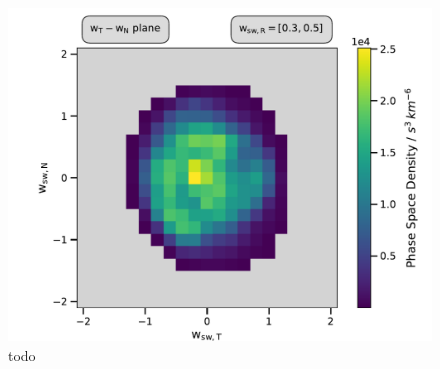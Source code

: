\begin{figure}[h]
	\includegraphics[width=.8\textwidth]{Figures/slices_50_3.pdf}
	\centering
	\caption{todo}
	\label{fig:psd_50}
\end{figure}


